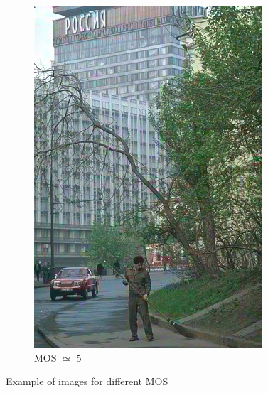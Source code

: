 \documentclass{article}
\begin{document}
\begin{figure}[ht]
\begin{subfigure}{2.9cm}
  \includegraphics[width=0.9\linewidth]{figures/ac_shuffle_chrominance_76_274007}
  \caption{MOS $\simeq$ 5}
  \label{fig:sub2}
\end{subfigure}

\caption{Example of images for different MOS}
\label{fig:images}
\end{figure}

\end{document}
